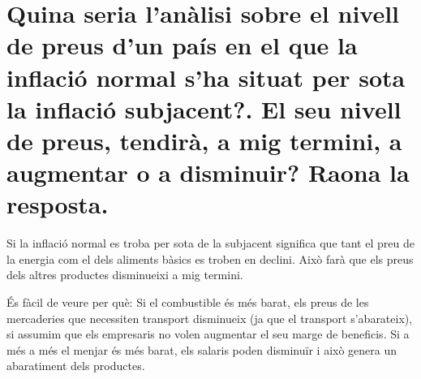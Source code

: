 \section{ 
Quina seria l’anàlisi sobre el nivell de preus d’un país en el que la inflació
normal s’ha situat per sota la inflació subjacent?. El seu nivell de preus, 
tendirà, a mig termini, a augmentar o a disminuir? Raona la resposta.}

Si la inflació normal es troba per sota de la subjacent significa que tant el
preu de la energia com el dels aliments bàsics es troben en declini. Això
farà que els preus dels altres productes disminueixi a mig termini.

És fàcil de veure per què: Si el combustible és més barat, els preus de les
mercaderies que necessiten transport disminueix (ja que el transport 
s'abarateix), si assumim que els empresaris no volen augmentar el seu
marge de beneficis. Si a més a més el menjar és més barat, els salaris poden
disminuïr i això genera un abaratiment dels productes.
